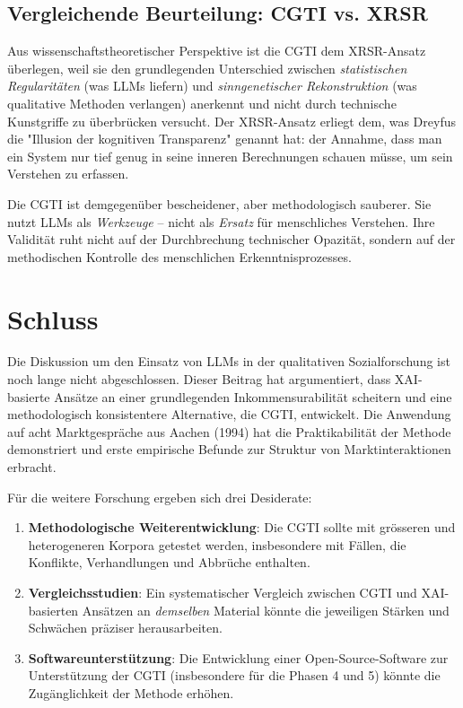 \documentclass[12pt,a4paper]{article}
\begin{document}
\subsection{Vergleichende Beurteilung: CGTI vs. XRSR}

Aus wissenschaftstheoretischer Perspektive ist die CGTI dem XRSR-Ansatz überlegen, weil sie den grundlegenden Unterschied zwischen \textit{statistischen Regularitäten} (was LLMs liefern) und \textit{sinngenetischer Rekonstruktion} (was qualitative Methoden verlangen) anerkennt und nicht durch technische Kunstgriffe zu überbrücken versucht. Der XRSR-Ansatz erliegt dem, was Dreyfus \cite{dreyfus1972what} die "Illusion der kognitiven Transparenz" genannt hat: der Annahme, dass man ein System nur tief genug in seine inneren Berechnungen schauen müsse, um sein Verstehen zu erfassen.

Die CGTI ist demgegenüber bescheidener, aber methodologisch sauberer. Sie nutzt LLMs als \textit{Werkzeuge} – nicht als \textit{Ersatz} für menschliches Verstehen. Ihre Validität ruht nicht auf der Durchbrechung technischer Opazität, sondern auf der methodischen Kontrolle des menschlichen Erkenntnisprozesses.

\section{Schluss}

Die Diskussion um den Einsatz von LLMs in der qualitativen Sozialforschung ist noch lange nicht abgeschlossen. Dieser Beitrag hat argumentiert, dass XAI-basierte Ansätze an einer grundlegenden Inkommensurabilität scheitern und eine methodologisch konsistentere Alternative, die CGTI, entwickelt. Die Anwendung auf acht Marktgespräche aus Aachen (1994) hat die Praktikabilität der Methode demonstriert und erste empirische Befunde zur Struktur von Marktinteraktionen erbracht.

Für die weitere Forschung ergeben sich drei Desiderate:

\begin{enumerate}
    \item \textbf{Methodologische Weiterentwicklung}: Die CGTI sollte mit grösseren und heterogeneren Korpora getestet werden, insbesondere mit Fällen, die Konflikte, Verhandlungen und Abbrüche enthalten.
    
    \item \textbf{Vergleichsstudien}: Ein systematischer Vergleich zwischen CGTI und XAI-basierten Ansätzen an \textit{demselben} Material könnte die jeweiligen Stärken und Schwächen präziser herausarbeiten.
    
    \item \textbf{Softwareunterstützung}: Die Entwicklung einer Open-Source-Software zur Unterstützung der CGTI (insbesondere für die Phasen 4 und 5) könnte die Zugänglichkeit der Methode erhöhen.
\end{enumerate}
\end{document}
